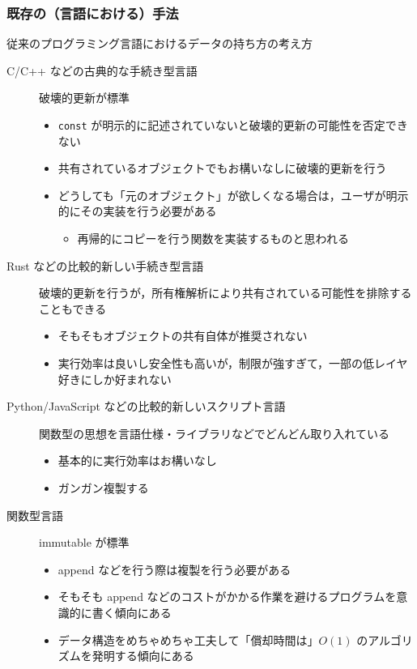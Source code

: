 \documentclass[10pt, a4j, twocolumn]{scrartcl}
\begin{document}
\subsubsection{既存の（言語における）手法}
\label{sec:org1c1fe5c}

従来のプログラミング言語におけるデータの持ち方の考え方
\begin{description}
\item[{C/C++ などの古典的な手続き型言語}] 破壊的更新が標準
\begin{itemize}
\item \texttt{const} が明示的に記述されていないと破壊的更新の可能性を否定できない
\item 共有されているオブジェクトでもお構いなしに破壊的更新を行う
\item どうしても「元のオブジェクト」が欲しくなる場合は，ユーザが明示的にその実装を行う必要がある
\begin{itemize}
\item 再帰的にコピーを行う関数を実装するものと思われる
\end{itemize}
\end{itemize}
\item[{Rust などの比較的新しい手続き型言語}] 破壊的更新を行うが，所有権解析により共有されている可能性を排除することもできる
\begin{itemize}
\item そもそもオブジェクトの共有自体が推奨されない
\item 実行効率は良いし安全性も高いが，制限が強すぎて，一部の低レイヤ好きにしか好まれない
\end{itemize}
\item[{Python/JavaScript などの比較的新しいスクリプト言語}] 関数型の思想を言語仕様・ライブラリなどでどんどん取り入れている
\begin{itemize}
\item 基本的に実行効率はお構いなし
\item ガンガン複製する
\end{itemize}
\item[{関数型言語}] immutable が標準
\begin{itemize}
\item append などを行う際は複製を行う必要がある
\item そもそも append などのコストがかかる作業を避けるプログラムを意識的に書く傾向にある
\item データ構造をめちゃめちゃ工夫して「償却時間は」\(O(1)\) のアルゴリズムを発明する傾向にある
\begin{itemize}

\end{itemize}
\end{itemize}
\end{description}
\end{document}
